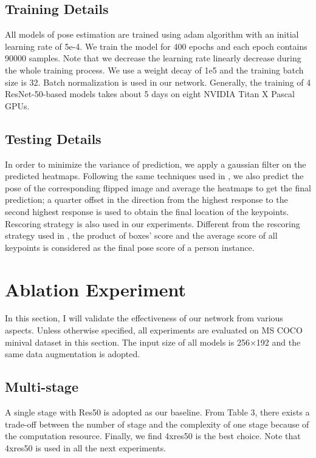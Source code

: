 \subsection{Training Details}
All models of pose estimation are trained using adam algorithm with an initial learning rate of 5e-4.
We train the model for 400 epochs and each epoch contains 90000 samples.
Note that we decrease the learning rate linearly decrease during the whole training process.
We use a weight decay of 1e5 and the training batch size is 32.
Batch normalization is used in our network.
Generally, the training of 4 ResNet-50-based models takes about 5 days on eight NVIDIA Titan X Pascal GPUs.

\subsection{Testing Details}
In order to minimize the variance of prediction, we apply a gaussian filter on the predicted heatmaps.
Following the same techniques used in \cite{newell2016stacked}, we also predict the pose of the corresponding flipped image and average the heatmaps to get the final prediction; a quarter
offset in the direction from the highest response to the second
highest response is used to obtain the final location of
the keypoints.
Rescoring strategy is also used in our experiments.
Different from the rescoring strategy used in \cite{papandreou2017towards},
the product of boxes’ score and the average score of all keypoints
is considered as the final pose score of a person instance.

\section{Ablation Experiment}
In this section, I will validate the effectiveness of our
network from various aspects. Unless otherwise specified,
all experiments are evaluated on MS COCO minival dataset
in this section. The input size of all models is 256×192
and the same data augmentation is adopted.

\subsection{Multi-stage}
A single stage with Res50 is adopted as our baseline. From Table 3, there exists a trade-off between the number of stage and the complexity of one stage because of the computation resource.
Finally, we find 4xres50 is the best choice.  Note that 4xres50 is used in all the next experiments.

